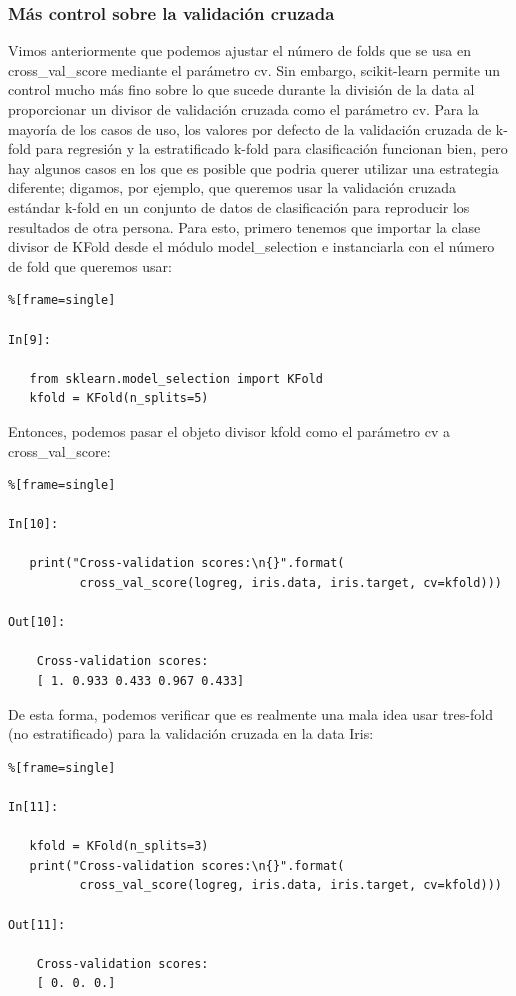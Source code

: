 \subsubsection{Más control sobre la validación cruzada}\label{VC}


Vimos anteriormente que podemos ajustar el número de folds que se usa  en {\ttfamily cross\_val\_score} mediante  el parámetro {\ttfamily cv}.   Sin embargo, {\ttfamily scikit-learn} permite un control mucho más fino sobre lo que sucede durante la división de la data al proporcionar un divisor de validación cruzada como el parámetro {\ttfamily cv}.  Para la mayoría de los casos de uso, los valores por defecto de la validación cruzada de k-fold para regresión y la  estratificado k-fold para clasificación funcionan bien, pero hay algunos casos en los que es posible que podria querer  utilizar una estrategia diferente; digamos, por ejemplo, que queremos usar la validación cruzada estándar k-fold en un conjunto 
de datos de clasificación para reproducir los resultados de otra persona.  Para esto, primero tenemos 
que importar la clase divisor de {\ttfamily KFold} desde el módulo {\ttfamily model\_selection} e instanciarla con el número de fold que  queremos usar:

\begin{lstlisting}%[frame=single]

In[9]:

   from sklearn.model_selection import KFold
   kfold = KFold(n_splits=5)

\end{lstlisting}


Entonces,  podemos pasar el objeto divisor {\ttfamily kfold} como el parámetro {\ttfamily cv} a {\ttfamily cross\_val\_score}:

\begin{lstlisting}%[frame=single]

In[10]:
  
   print("Cross-validation scores:\n{}".format(
          cross_val_score(logreg, iris.data, iris.target, cv=kfold)))

Out[10]:
    
    Cross-validation scores:
    [ 1. 0.933 0.433 0.967 0.433]

\end{lstlisting}

De esta forma, podemos verificar que es realmente una mala idea usar tres-fold (no estratificado) para la  validación cruzada en la data Iris:

\begin{lstlisting}%[frame=single]

In[11]:

   kfold = KFold(n_splits=3)
   print("Cross-validation scores:\n{}".format(
          cross_val_score(logreg, iris.data, iris.target, cv=kfold)))

Out[11]:

    Cross-validation scores:
    [ 0. 0. 0.]

\end{lstlisting}


